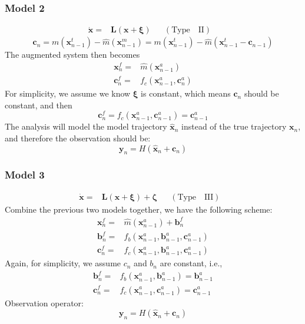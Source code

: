 \documentclass{beamer}
\begin{document}
\begin{frame}
\frametitle{Model 2}
\begin{align*} 
\dot{\pmb{x}}=&\pmb{L}(\pmb{x}+\pmb{\xi}) 
&&\mathrm{(Type\quad II)}&
\end{align*}
\begin{equation*}
\pmb{c}_{n}=m(\pmb{x}_{n-1}^{t})-\hat{m}(\pmb{x}_{n-1}^{m})=m(\pmb{x}_{n-1}^{t})-\hat{m}(\pmb{x}_{n-1}^{t}-\pmb{c}_{n-1})
\end{equation*}
The augmented system then becomes
\begin{align*}
\pmb{x}_{n}^{f}=&\hat{m}(\pmb{x}_{n-1}^{a})\\
\pmb{c}_{n}^{f}=&f_{c}(\pmb{x}_{n-1}^{a},\pmb{c}_{n}^{a})
\end{align*}
For simplicity, we assume we know $\pmb{\xi}$ is constant, which means $\pmb{c}_n$ should be constant, and then
\begin{equation*}
\pmb{c}_{n}^{f}=f_{c}(\pmb{x}_{n-1}^{a},\pmb{c}_{n-1}^{a})=\pmb{c}_{n-1}^{a}
\end{equation*} 
The analysis will model the model trajectory $\hat{\pmb{x}}_{n}$ instead of the true trajectory $\pmb{x}_n$, and therefore the observation should be:
\begin{equation*}
\pmb{y}_n=H(\hat{\pmb{x}}_n+\pmb{c}_n)
\end{equation*}
\end{frame}

\begin{frame}
\frametitle{Model 3}
\begin{align*} 
\dot{\pmb{x}}=&\pmb{L}(\pmb{x}+\pmb{\xi})+\pmb{\zeta} 
&&\mathrm{(Type\quad III)}&
\end{align*}
Combine the previous two models together, we have the following scheme:
\begin{align*}
\pmb{x}_{n}^{f}=&\hat{m}(\pmb{x}_{n-1}^{a})+\pmb{b}_{n}^{f}\\
\pmb{b}_{n}^{f}=&f_{b}(\pmb{x}_{n-1}^{a},\pmb{b}_{n-1}^{a},\pmb{c}_{n-1}^{a})\\
\pmb{c}_{n}^{f}=&f_{c}(\pmb{x}_{n-1}^{a},\pmb{b}_{n-1}^{a},\pmb{c}_{n-1}^{a})
\end{align*}
Again, for simplicity, we assume $c_n$ and $b_n$ are constant, i.e.,
\begin{align*}
\pmb{b}_{n}^{f}=&f_{b}(\pmb{x}_{n-1}^{a},\pmb{b}_{n-1}^{a})=\pmb{b}_{n-1}^{a}\\
\pmb{c}_{n}^{f}=&f_{c}(\pmb{x}_{n-1}^{a},\pmb{c}_{n-1}^{a})=\pmb{c}_{n-1}^{a}
\end{align*}
Observation operator:
\begin{equation*}
\pmb{y}_n=H(\hat{\pmb{x}}_n+\pmb{c}_n)
\end{equation*}
\end{frame}
\end{document}
